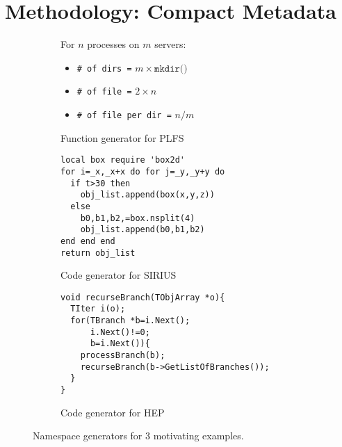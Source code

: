 \vspace{-0.5em}
\section{Methodology: Compact Metadata}
\label{sec:methodology}
\vspace{-0.5em}

\begin{figure*}[t]
  \centering
  \begin{subfigure}[b]{0.3\linewidth}
    For \(n\) processes on \(m\) servers:
    \begin{itemize}
      \setlength\itemsep{-0.5em}
      \item[] \texttt{\# of dirs =} \(m \times \texttt{mkdir()}\)
      \item[] \texttt{\# of file =} \(2 \times n\)
      \item[] \texttt{\# of file per dir =} \(n/m\)
    \end{itemize}
    \caption{Function generator for PLFS\vspace{1em}} \label{fig:plfs}
  \end{subfigure}
  \begin{subfigure}[b]{0.3\linewidth}
      \footnotesize
      \begin{verbatim}
local box require 'box2d'
for i=_x,_x+x do for j=_y,_y+y do
  if t>30 then 
    obj_list.append(box(x,y,z))
  else 
    b0,b1,b2,=box.nsplit(4)
    obj_list.append(b0,b1,b2)
end end end 
return obj_list
     \end{verbatim}
      \caption{Code generator for SIRIUS\vspace{1em}} \label{fig:sirius}
  \end{subfigure}
  \begin{subfigure}[b]{0.35\linewidth}
      \centering
      \footnotesize
      \begin{verbatim}
void recurseBranch(TObjArray *o){
  TIter i(o); 
  for(TBranch *b=i.Next();
      i.Next()!=0;
      b=i.Next()){
    processBranch(b);
    recurseBranch(b->GetListOfBranches());
  }
}
      \end{verbatim}
      \caption{Code generator for HEP\vspace{1em}} \label{fig:hep}
  \end{subfigure}
\caption{Namespace generators for 3 motivating examples.\label{fig:use-cases}}
\end{figure*}

 

